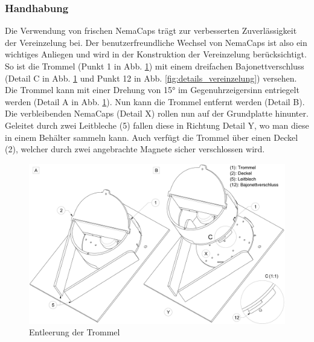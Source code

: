 \subsubsection{Handhabung}
Die Verwendung von frischen NemaCaps trägt zur verbesserten Zuverlässigkeit der Vereinzelung bei. Der benutzerfreundliche Wechsel von NemaCaps ist also ein wichtiges Anliegen und wird in der Konstruktion der Vereinzelung berücksichtigt. So ist die Trommel (Punkt 1 in Abb. \ref{fig:vereinzelung_entleeren}) mit einem dreifachen Bajonettverschluss (Detail C in Abb. \ref{fig:vereinzelung_entleeren} und Punkt 12 in Abb. \ref{fig:details_vereinzelung}) versehen. Die Trommel kann mit einer Drehung von 15° im Gegenuhrzeigersinn entriegelt werden (Detail A in Abb. \ref{fig:vereinzelung_entleeren}). Nun kann die Trommel entfernt werden (Detail B). Die verbleibenden NemaCaps (Detail X) rollen nun auf der Grundplatte hinunter. Geleitet durch zwei Leitbleche (5) fallen diese in Richtung Detail Y, wo man diese in einem Behälter sammeln kann. Auch verfügt die Trommel über einen Deckel (2), welcher durch zwei angebrachte Magnete sicher verschlossen wird.
	\begin{figure}[H]
	\includegraphics[scale=0.42]{Illustrationen/6-Umsetzung/vereinzelung_entleeren.jpg}
	\caption{Entleerung der Trommel}
	\label{fig:vereinzelung_entleeren}
	\end{figure}
